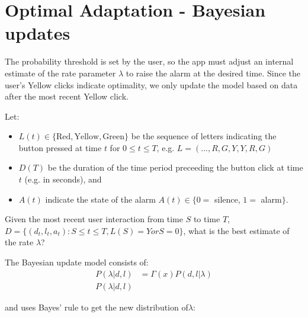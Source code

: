 \documentclass{article}
\begin{document}
\section{Optimal Adaptation - Bayesian updates}
The probability threshold is set by the user, so the app must adjust an internal estimate of the rate parameter $\lambda$ to raise the alarm at the desired time.  Since the user's Yellow clicks indicate optimality, we only update the model based on data after the most recent Yellow click.

Let:
\begin{itemize}
\item $L(t)\in \{\text{Red},\text{Yellow},\text{Green}\}$ be the sequence of letters indicating the button pressed at time $t$ for $0 \leq t \leq T$, e.g. $L=(..., R, G, Y, Y, R, G)$
\item $D(T)$ be the duration of the time period preceeding the button click at time $t$ (e.g. in seconds), and
\item $A(t)$ indicate the state of the alarm $A(t) \in \{0=$ silence, $1=$ alarm$\}$.
\end{itemize} 
Given the most recent user interaction from time $S$ to time $T$,  $D=\{(d_t, l_t, a_t) : S \leq t \leq T , L(S)=Y or S=0\}$, what is the best estimate of the rate $\lambda$?


The Bayesian update model consists of:
\begin{align}
  P(\lambda|d, l) &= \Gamma(x) P(d, l|\lambda)\nonumber\\
  P(\lambda|d, l)
\end{align}


and  uses Bayes' rule to get the new distribution of$\lambda$:








\end{document}

